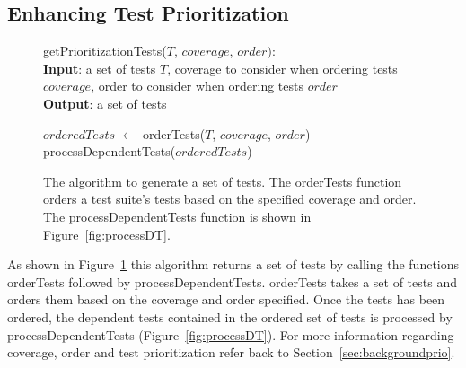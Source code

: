 \subsection{Enhancing Test Prioritization}
\label{sec:enhanceprio}
\begin{figure}[t]
	getPrioritizationTests($\mathit{T}$, $\mathit{coverage}$, $\mathit{order}):$\\
	\textbf{Input}: a set of tests $\mathit{T}$, coverage to consider when ordering
	tests $\mathit{coverage}$, order to consider when ordering tests $\mathit{order}$\\
	\textbf{Output}: a set of tests\\
	 \begin{algorithmic}[1]
	 	\vspace{-5mm}
		\STATE $\mathit{orderedTests}$ $\leftarrow$ orderTests($\mathit{T}$,
		$\mathit{coverage}$, $\mathit{order}$)
		\RETURN processDependentTests($\mathit{orderedTests}$)
	\end{algorithmic}
	\vspace{-3mm}
	\caption {
		The algorithm to generate a set of tests. The orderTests function orders
		a test suite's tests based on the specified coverage and order. The
		processDependentTests function is shown in Figure~\ref{fig:processDT}.
	}
	\label{fig:prioritization}
\end{figure}
As shown in Figure~\ref{fig:prioritization} this algorithm returns a
set of tests by calling the functions orderTests followed by
processDependentTests. orderTests takes a set of tests and orders them based on
the coverage and order specified. Once the tests has been
ordered, the dependent tests contained in the ordered set of tests is processed by
processDependentTests (Figure~\ref{fig:processDT}). For more information
regarding coverage, order and test prioritization refer back to
Section~\ref{sec:backgroundprio}.

